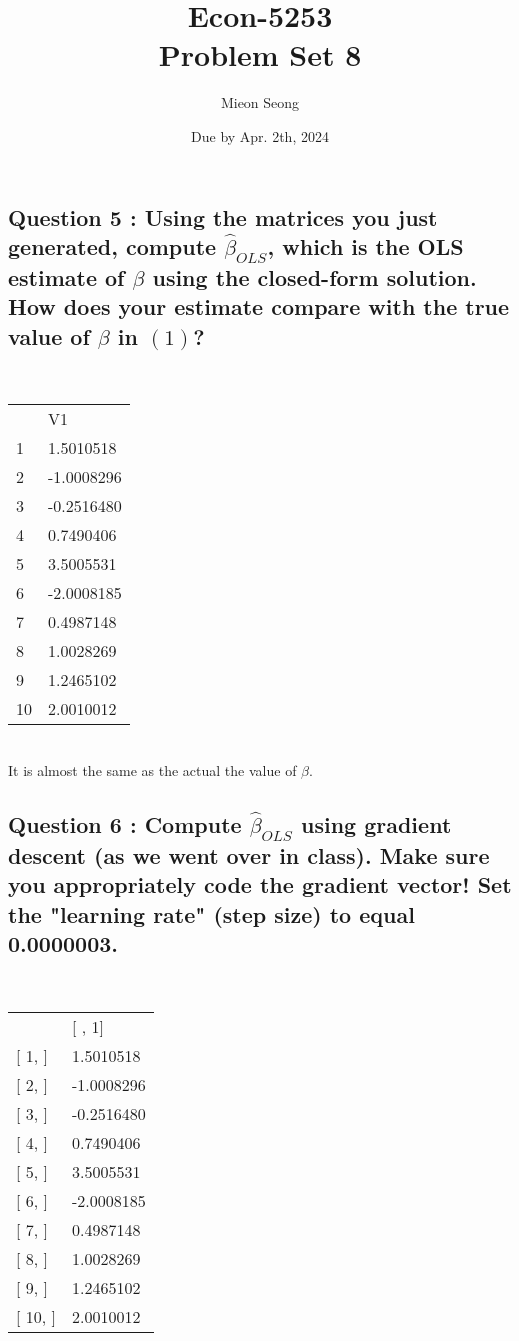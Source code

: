 \documentclass[12pt, letterpaper]{article}
\title{Econ-5253\\
{Problem Set 8}  \\
\large  \vspace{-1em}}
\author{Mieon Seong}
\date{Due by Apr. 2th, 2024}
\begin{document}
\setlength{\abovedisplayskip}{5pt}
\setlength{\belowdisplayskip}{5pt}
\setlength{\abovedisplayshortskip}{5pt}
\setlength{\belowdisplayshortskip}{5pt}

\maketitle

\subsection*{Question 5 : Using the matrices you just generated, compute $\hat{\beta}_{OLS}$, which is the OLS estimate of $\beta$ using the closed-form solution. How does your estimate compare with the true value of $\beta$ in $(1)$?}
\
\begin{table}[h]
\begin{tabular}{ll}
   & V1         \\
1  & 1.5010518  \\
2  & -1.0008296 \\
3  & -0.2516480 \\
4  & 0.7490406  \\
5  & 3.5005531  \\
6  & -2.0008185 \\
7  & 0.4987148  \\
8  & 1.0028269  \\
9  & 1.2465102  \\
10 & 2.0010012 
\end{tabular}
\end{table}
\\
It is almost the same as the actual the value of $\beta$.
\\
\newpage
\subsection*{Question 6 : Compute $\hat{\beta}_{OLS}$ using gradient descent (as we went over in class). Make sure you appropriately code the gradient vector! Set the "learning rate" (step size) to equal 0.0000003.}
\\
\begin{table}[h]
\begin{tabular}{ll}
            & {[} , 1{]} \\
{[} 1, {]}  & 1.5010518  \\
{[} 2, {]}  & -1.0008296 \\
{[} 3, {]}  & -0.2516480 \\
{[} 4, {]}  & 0.7490406  \\
{[} 5, {]}  & 3.5005531  \\
{[} 6, {]}  & -2.0008185 \\
{[} 7, {]}  & 0.4987148  \\
{[} 8, {]}  & 1.0028269  \\
{[} 9, {]}  & 1.2465102  \\
{[} 10, {]} & 2.0010012 
\end{tabular}
\end{table}
\\
\end{document}

